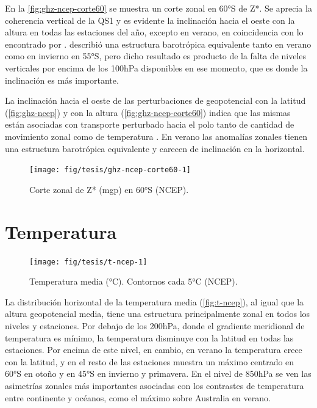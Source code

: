 \documentclass[spanish,a4paper,12pt,oneside]{book}
\begin{document}
En la \autoref{fig:ghz-ncep-corte60} se muestra un corte zonal en 60°S
de Z*. Se aprecia la coherencia vertical de la QS1 y es evidente la
inclinación hacia el oeste con la altura en todas las estaciones del
año, excepto en verano, en coincidencia con lo encontrado por
\citet{Quintanar1995a}. \citet{Karoly1985} describió una estructura
barotrópica equivalente tanto en verano como en invierno en 55°S, pero
dicho resultado es producto de la falta de niveles verticales por encima
de los 100hPa disponibles en ese momento, que es donde la inclinación es
más importante.

La inclinación hacia el oeste de las perturbaciones de geopotencial con
la latitud (\autoref{fig:ghz-ncep}) y con la altura
(\autoref{fig:ghz-ncep-corte60}) indica que las mismas están asociadas
con transporte perturbado hacia el polo tanto de cantidad de movimiento
zonal como de temperatura \citep{James}. En verano las anomalías zonales
tienen una estructura barotrópica equivalente y carecen de inclinación
en la horizontal.

\begin{figure}
\texttt{[image: fig/tesis/ghz-ncep-corte60-1]} \caption{Corte zonal de Z* (mgp) en 60°S (NCEP).}\label{fig:ghz-ncep-corte60}
\end{figure}

\hypertarget{temperatura}{%
\section{Temperatura}\label{temperatura}}

\begin{landscape}\begin{figure}

{\centering \texttt{[image: fig/tesis/t-ncep-1]} 

}

\caption{Temperatura media (°C). Contornos cada 5°C (NCEP).}\label{fig:t-ncep}
\end{figure}
\end{landscape}

La distribución horizontal de la temperatura media
(\autoref{fig:t-ncep}), al igual que la altura geopotencial media, tiene
una estructura principalmente zonal en todos los niveles y estaciones.
Por debajo de los 200hPa, donde el gradiente meridional de temperatura
es mínimo, la temperatura disminuye con la latitud en todas las
estaciones. Por encima de este nivel, en cambio, en verano la
temperatura crece con la latitud, y en el resto de las estaciones
muestra un máximo centrado en 60°S en otoño y en 45°S en invierno y
primavera. En el nivel de 850hPa se ven las asimetrías zonales más
importantes asociadas con los contrastes de temperatura entre continente
y océanos, como el máximo sobre Australia en verano.
\end{document}
